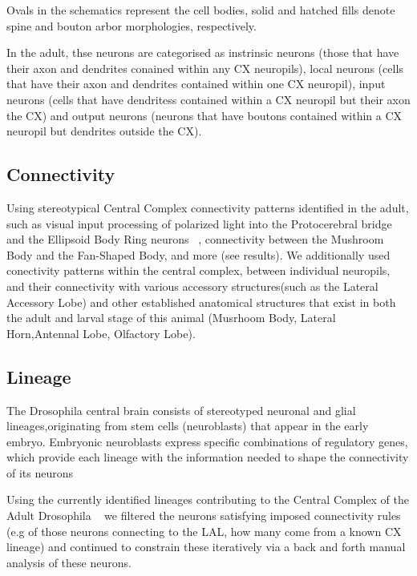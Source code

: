 \documentclass{article}
\begin{document}
 Ovals in the schematics represent the cell bodies, solid and hatched fills denote spine and bouton arbor morphologies, respectively.

In the adult, thse neurons are categorised as instrinsic neurons (those that have their axon and dendrites conained within any CX neuropils), local neurons (cells that have their axon and dendrites contained within one CX neuropil), input neurons (cells that have dendritess contained within a CX neuropil but their axon the CX) and output neurons (neurons that have boutons contained within a CX neuropil but dendrites outside the CX).

 
 
 \subsection{Connectivity}
    Using stereotypical Central Complex connectivity patterns identified in the adult, such as visual input processing  of polarized light into the Protocerebral bridge and the Ellipsoid Body Ring neurons ~\citep
    {hardcastle2021visual, lin2013comprehensive, hulse2021connectome}, connectivity between the Mushroom Body and the Fan-Shaped Body, and more (see results). 
    We additionally used conectivity patterns within the central complex, between individual neuropils, and their connectivity with various accessory structures(such as the Lateral Accessory Lobe) and other established anatomical structures that exist in both the adult and larval stage of this animal (Musrhoom Body, Lateral Horn,Antennal Lobe, Olfactory Lobe).

 \subsection{Lineage}
 The Drosophila central brain consists of stereotyped neuronal and glial lineages,originating from stem cells (neuroblasts) that appear in the early embryo. 
 Embryonic neuroblasts express specific combinations of regulatory genes, which provide each lineage with the information needed to shape the connectivity of its neurons 

 
 Using the currently identified lineages contributing to the Central Complex of the Adult Drosophila ~\citep{andrade2019developmentally}%
 we filtered the neurons satisfying imposed connectivity rules (e.g of those neurons connecting to the LAL, how many come from a known CX lineage) and continued to constrain these iteratively via a back and forth manual analysis of these neurons. 
\end{document}

